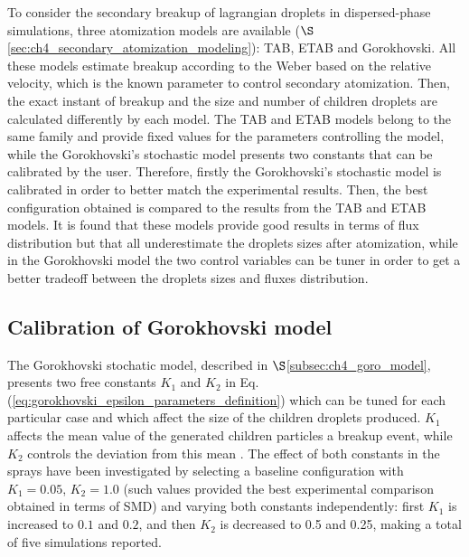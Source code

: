 To consider the secondary breakup of lagrangian droplets in dispersed-phase simulations, three atomization models are available ($\S$\ref{sec:ch4_secondary_atomization_modeling}): TAB, ETAB and Gorokhovski. All these models estimate breakup according to the Weber based on the relative velocity, which is the known parameter to control secondary atomization. Then, the exact instant of breakup and the size and number of children droplets are calculated differently by each model. The TAB and ETAB models belong to the same family and provide fixed values for the parameters controlling the model, while the Gorokhovski's stochastic model presents two constants that can be calibrated by the user. Therefore, firstly the Gorokhovski's stochastic model is calibrated in order to better match the experimental results.  Then, the best configuration obtained is compared to the results from the TAB and ETAB models. It is found that these models provide good results in terms of flux distribution but that all underestimate the droplets sizes after atomization, while in the Gorokhovski model the two control variables can be tuner in order to get a better tradeoff between the droplets sizes and fluxes distribution.

\subsection{Calibration of Gorokhovski model}
\label{subsec:second_atom_goro_calibration}

The Gorokhovski stochatic model, described in $\S$\ref{subsec:ch4_goro_model}, presents two free constants $K_1$ and $K_2$ in Eq. (\ref{eq:gorokhovski_epsilon_parameters_definition}) which can be tuned for each particular case and which affect the size of the children droplets produced.  $K_1$ affects the mean value of the generated children particles a breakup event, while $K_2$ controls the deviation from this mean . The effect of both constants in the sprays have been investigated by selecting a baseline configuration with $K_1 = 0.05$, $K_2 = 1.0$ (such values provided the best experimental comparison obtained in terms of SMD) and varying both constants independently: first $K_1$ is increased to $0.1$ and $0.2$, and then $K_2$ is decreased to 0.5 and 0.25, making a total of five simulations reported. 

